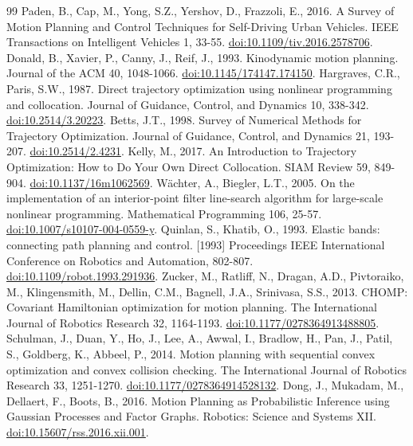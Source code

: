 \begin{thebibliography}{99}
\fontsize{6.4}{8.1}\selectfont
{} Paden, B., Cap, M., Yong, S.Z., Yershov, D., Frazzoli, E., 2016. A Survey of Motion Planning and Control Techniques for Self-Driving Urban Vehicles. IEEE Transactions on Intelligent Vehicles 1, 33-55. \href{https://doi.org/10.1109/tiv.2016.2578706}{doi:10.1109/tiv.2016.2578706}.
 Donald, B., Xavier, P., Canny, J., Reif, J., 1993. Kinodynamic motion planning. Journal of the ACM 40, 1048-1066. \href{https://doi.org/10.1145/174147.174150}{doi:10.1145/174147.174150}.
 Hargraves, C.R., Paris, S.W., 1987. Direct trajectory optimization using nonlinear programming and collocation. Journal of Guidance, Control, and Dynamics 10, 338-342. \href{https://doi.org/10.2514/3.20223}{doi:10.2514/3.20223}.
 Betts, J.T., 1998. Survey of Numerical Methods for Trajectory Optimization. Journal of Guidance, Control, and Dynamics 21, 193-207. \href{https://doi.org/10.2514/2.4231}{doi:10.2514/2.4231}.
 Kelly, M., 2017. An Introduction to Trajectory Optimization: How to Do Your Own Direct Collocation. SIAM Review 59, 849-904. \href{https://doi.org/10.1137/16m1062569}{doi:10.1137/16m1062569}.
 Wächter, A., Biegler, L.T., 2005. On the implementation of an interior-point filter line-search algorithm for large-scale nonlinear programming. Mathematical Programming 106, 25-57. \href{https://doi.org/10.1007/s10107-004-0559-y}{doi:10.1007/s10107-004-0559-y}.
 Quinlan, S., Khatib, O., 1993. Elastic bands: connecting path planning and control. [1993] Proceedings IEEE International Conference on Robotics and Automation, 802-807. \href{https://doi.org/10.1109/robot.1993.291936}{doi:10.1109/robot.1993.291936}.
 Zucker, M., Ratliff, N., Dragan, A.D., Pivtoraiko, M., Klingensmith, M., Dellin, C.M., Bagnell, J.A., Srinivasa, S.S., 2013. CHOMP: Covariant Hamiltonian optimization for motion planning. The International Journal of Robotics Research 32, 1164-1193. \href{https://doi.org/10.1177/0278364913488805}{doi:10.1177/0278364913488805}.
 Schulman, J., Duan, Y., Ho, J., Lee, A., Awwal, I., Bradlow, H., Pan, J., Patil, S., Goldberg, K., Abbeel, P., 2014. Motion planning with sequential convex optimization and convex collision checking. The International Journal of Robotics Research 33, 1251-1270. \href{https://doi.org/10.1177/0278364914528132}{doi:10.1177/0278364914528132}.
 Dong, J., Mukadam, M., Dellaert, F., Boots, B., 2016. Motion Planning as Probabilistic Inference using Gaussian Processes and Factor Graphs. Robotics: Science and Systems XII. \href{https://doi.org/10.15607/rss.2016.xii.001}{doi:10.15607/rss.2016.xii.001}.

\end{thebibliography}
